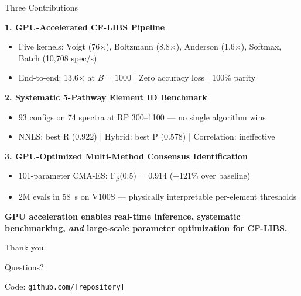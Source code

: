 \documentclass[aspectratio=169,10pt]{beamer}
\begin{document}
\begin{frame}{Three Contributions}
	{\small
	\textbf{1. GPU-Accelerated CF-LIBS Pipeline}
	\begin{itemize}
		\item Five kernels: Voigt (\alert{76$\times$}), Boltzmann (\alert{8.8$\times$}),
		      Anderson (\alert{1.6$\times$}), Softmax, Batch (\alert{10,708} spec/s)
		\item End-to-end: \alert{13.6$\times$} at $B\!=\!1000$ | \alert{Zero accuracy loss} | 100\% parity
	\end{itemize}

	\vspace{0.2em}
	\textbf{2. Systematic 5-Pathway Element ID Benchmark}
	\begin{itemize}
		\item 93 configs on 74 spectra at RP 300--1100 --- no single algorithm wins
		\item NNLS: best R (0.922) | Hybrid: best P (0.578) | Correlation: ineffective
	\end{itemize}

	\vspace{0.2em}
	\textbf{3. GPU-Optimized Multi-Method Consensus Identification}
	\begin{itemize}
		\item 101-parameter CMA-ES: \alert{F\textsubscript{$\beta$}(0.5) = 0.914} (+121\% over baseline)
		\item 2M evals in 58~s on V100S --- physically interpretable per-element thresholds
	\end{itemize}
	}

	\vspace{0.3em}
	\centering
	{\small\textbf{GPU acceleration enables real-time inference, systematic benchmarking,
	\emph{and} large-scale parameter optimization for CF-LIBS.}}
\end{frame}

\begin{frame}
	\centering
	\vspace{2em}
	{\Large Thank you}

	\vspace{1em}
	{\large Questions?}

	\vspace{1.5em}
	{\normalsize Code: \texttt{github.com/[repository]}}
\end{frame}
\end{document}
